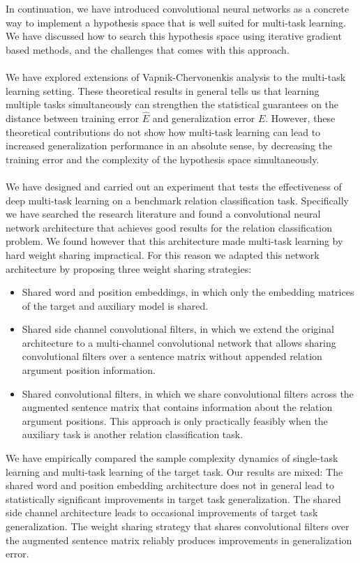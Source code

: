 In continuation, we have introduced convolutional neural networks as a concrete way to implement a hypothesis space that is well suited for multi-task learning. We have discussed how to search this hypothesis space using iterative gradient based methods, and the challenges that comes with this approach.
\\\\
We have explored extensions of Vapnik-Chervonenkis analysis to the multi-task learning setting. These theoretical results in general tells us that learning multiple tasks simultaneously can strengthen the statistical guarantees on the distance between training error $\hat{E}$ and generalization error $E$. However, these theoretical contributions do not show how multi-task learning can lead to increased generalization performance in an absolute sense, by decreasing the training error and the complexity of the hypothesis space simultaneously.
\\\\
We have designed and carried out an experiment that tests the effectiveness of deep multi-task learning on a benchmark relation classification task. Specifically we have searched the research literature and found a convolutional neural network architecture that achieves good results for the relation classification problem. We found however that this architecture made multi-task learning by hard weight sharing impractical. For this reason we adapted this network architecture by proposing three weight sharing strategies:
\begin{itemize}
	\item Shared word and position embeddings, in which only the embedding matrices of the target and auxiliary model is shared.
	\item Shared side channel convolutional filters, in which we extend the original architecture to a multi-channel convolutional network that allows sharing convolutional filters over a sentence matrix without appended relation argument position information.
	\item Shared convolutional filters, in which we share convolutional filters across the augmented sentence matrix that contains information about the relation argument positions. This approach is only practically feasibly when the auxiliary task is another relation classification task.
\end{itemize}
We have empirically compared the sample complexity dynamics of single-task learning and multi-task learning of the target task. Our results are mixed: The shared word and position embedding architecture does not in general lead to statistically significant improvements in target task generalization. The shared side channel architecture leads to occasional improvements of target task generalization. The weight sharing strategy that shares convolutional filters over the augmented sentence matrix reliably produces improvements in generalization error.
